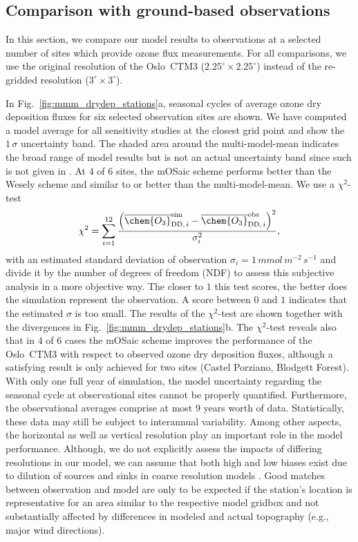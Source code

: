 \documentclass[gmd, manuscript]{copernicus}
\begin{document}
\subsection{Comparison with ground-based observations}
\label{subsec:obs}
In this section, we compare our model results to observations at a selected number of sites which provide ozone flux measurements. For all comparisons, we use the original resolution of the Oslo~CTM3 ($2.25^\circ\times 2.25^\circ$) instead of the re-gridded resolution ($3^\circ\times 3^\circ$).

In Fig.~\ref{fig:mmm_drydep_stations}a, seasonal cycles of average ozone dry deposition fluxes for six selected observation sites are shown. We have computed a model average for all sensitivity studies at the closest grid point and show the $1\,\sigma$ uncertainty band. The shaded area around the multi-model-mean indicates the broad range of model results but is not an actual uncertainty band since such is not given in \citet{ACP:Hardacre2015}. At $4$ of $6$ sites, the mOSaic scheme performs better than the Wesely scheme and similar to or better than the multi-model-mean. We use a $\chi^2$-test
\begin{equation}
  \chi^2 = \sum_{i=1}^{12}\frac{\left(\overline{\chem{O_3}}_{\text{DD,\,}i}^\text{sim}-\overline{\chem{O_3}}_{\text{DD,\,}i}^\text{obs}\right)^2}{\sigma_i^2},
\end{equation}
with an estimated standard deviation of observation $\sigma_i=1\,\unit{mmol\,m^{-2}\,s^{-1}}$ and divide it by the number of degrees of freedom (NDF) to assess this subjective analysis in a more objective way. The closer to $1$ this test scores, the better does the simulation represent the observation. A score between $0$ and $1$ indicates that the estimated $\sigma$ is too small. The results of the $\chi^2$-test are shown together with the divergences in Fig.~\ref{fig:mmm_drydep_stations}b. The $\chi^2$-test reveals also that in $4$ of $6$ cases the mOSaic scheme improves the performance of the Oslo~CTM3 with respect to observed ozone dry deposition fluxes, although a satisfying result is only achieved for two sites (Castel Porziano, Blodgett Forest).
With only one full year of simulation, the model uncertainty regarding the seasonal cycle at observational sites cannot be properly quantified. Furthermore, the observational averages comprise at most $9$ years worth of data. Statistically, these data may still be subject to interannual variability. Among other aspects, the horizontal as well as vertical resolution play an important role in the model performance. Although, we do not explicitly assess the impacts of differing resolutions in our model, we can assume that both high and low biases exist due to dilution of sources and sinks in coarse resolution models \citep{AE:Schaap2015}. Good matches between observation and model are only to be expected if the station's location is representative for an area similar to the respective model gridbox and not substantially affected by differences in modeled and actual topography (e.g., major wind directions).
\end{document}

